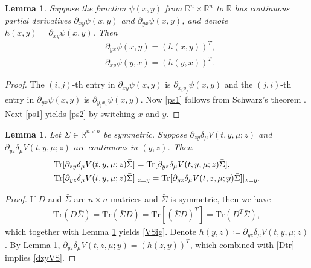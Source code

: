 \documentclass{amsart}
\newtheorem{lemma}[theorem]{Lemma}
\theoremstyle{definition}
\theoremstyle{remark}
\numberwithin{equation}{section}
\begin{document}
\begin{lemma} \label{lemma:psixy}
Suppose the function $\psi(x,y)$ from $\mathbb{R}^n\times \mathbb{R}^n$ to $\mathbb{R}$ has continuous partial derivatives $\partial_{xy}\psi(x,y)$ and $\partial_{yx}\psi(x,y)$, and denote $h(x,y)=\partial_{xy}\psi(x,y)$. Then
\begin{align}
&\partial_{yx}\psi(x,y)= (h(x,y))^T, \label{ps1} \\
&\partial_{xy} \psi(y,x) =( h(y,x))^T. \label{ps2}
\end{align}
\end{lemma}
\begin{proof}
 The $(i,j)$-th entry in $\partial_{xy}\psi(x,y)$ is $\partial_{x_iy_j}\psi(x,y)$ and  the $(j,i)$-th entry in $\partial_{yx} \psi(x,y)$ is $\partial_{y_jx_i}\psi(x,y)$.
Now \eqref{ps1} follows from Schwarz's theorem \cite{HW08}. Next \eqref{ps1} yields
\eqref{ps2} by switching  $x$ and $y$.
\end{proof}


\begin{lemma}\label{lemma:trDyz}
Let $\bar\Sigma\in \mathbb{R}^{n\times n }$ be symmetric. Suppose
$ \partial_{zy}\delta_\mu V(t, y, \mu; z) $ and $\partial_{yz}\delta_\mu V(t, y, \mu; z)$ are continuous in $(y,z)$.
Then
\begin{align}
&\mbox{\rm Tr}[\partial_{zy}\delta_\mu V(t, y, \mu; z)\bar \Sigma] =\mbox{\rm Tr}[\partial_{yz}\delta_\mu V(t, y, \mu; z)\bar \Sigma], \label{VSig}\\
& \mbox{\rm Tr}[\partial_{yz}\delta_\mu V(t, y, \mu; z)\bar \Sigma]|_{z=y} =
\mbox{\rm Tr}[\partial_{yz}\delta_\mu V(t, z, \mu; y)\bar \Sigma]|_{z=y}.
\label{dzyVS}
\end{align}
\end{lemma}
\begin{proof}
 If $D$ and $\bar \Sigma$ are  $n\times n$ matrices and $\bar \Sigma$ is symmetric, then we have
\begin{align}
 \mbox{Tr} ( D\bar \Sigma )=\mbox{Tr} ( \bar \Sigma D) = \mbox{Tr}[ ( \bar \Sigma D)^T]= \mbox{Tr} (D^T\bar \Sigma),\label{Dtr}
\end{align}
which together with  Lemma \ref{lemma:psixy}  yields \eqref{VSig}.
Denote $h(y,z)\coloneqq \partial_{yz} \delta_\mu V(t, y,\mu;z)$.
By Lemma \ref{lemma:psixy}, $\partial_{yz}\delta_\mu V(t, z, \mu; y)=(h(z,y))^T$,  which combined with \eqref{Dtr} implies \eqref{dzyVS}.
\end{proof}
\end{document}
